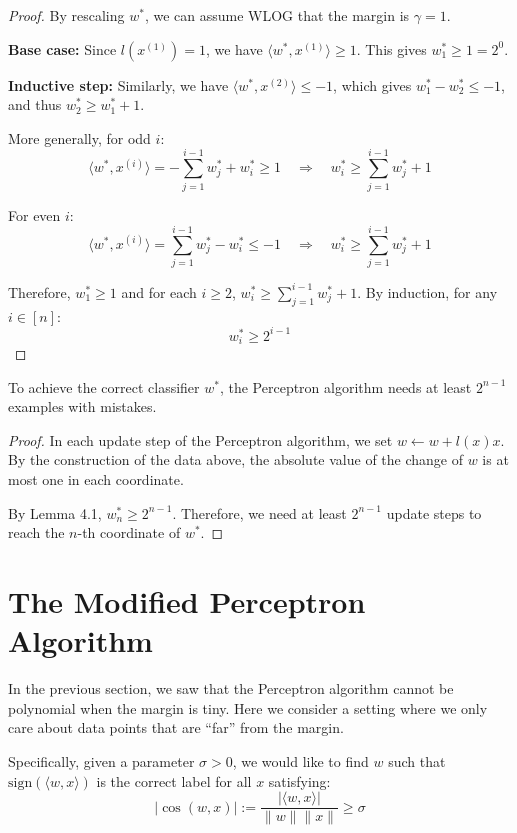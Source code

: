 \documentclass[main.tex]{subfiles}
\begin{document}
\begin{proof}
By rescaling $w^*$, we can assume WLOG that the margin is $\gamma = 1$.

\textbf{Base case:} Since $l(x^{(1)}) = 1$, we have $\langle w^*, x^{(1)} \rangle \geq 1$. This gives $w^*_1 \geq 1 = 2^0$.

\textbf{Inductive step:} Similarly, we have $\langle w^*, x^{(2)} \rangle \leq -1$, which gives $w^*_1 - w^*_2 \leq -1$, and thus $w^*_2 \geq w^*_1 + 1$.

More generally, for odd $i$:
$$\langle w^*, x^{(i)} \rangle = -\sum_{j=1}^{i-1} w^*_j + w^*_i \geq 1 \quad \Rightarrow \quad w^*_i \geq \sum_{j=1}^{i-1} w^*_j + 1$$

For even $i$:
$$\langle w^*, x^{(i)} \rangle = \sum_{j=1}^{i-1} w^*_j - w^*_i \leq -1 \quad \Rightarrow \quad w^*_i \geq \sum_{j=1}^{i-1} w^*_j + 1$$

Therefore, $w^*_1 \geq 1$ and for each $i \geq 2$, $w^*_i \geq \sum_{j=1}^{i-1} w^*_j + 1$. By induction, for any $i \in [n]$:
$$w^*_i \geq 2^{i-1}$$
\end{proof}

\begin{corollary}
To achieve the correct classifier $w^*$, the Perceptron algorithm needs at least $2^{n-1}$ examples with mistakes.
\end{corollary}

\begin{proof}
In each update step of the Perceptron algorithm, we set $w \leftarrow w + l(x)x$. By the construction of the data above, the absolute value of the change of $w$ is at most one in each coordinate.

By Lemma 4.1, $w^*_n \geq 2^{n-1}$. Therefore, we need at least $2^{n-1}$ update steps to reach the $n$-th coordinate of $w^*$.
\end{proof}

\needspace{0.33\textheight}
\section{The Modified Perceptron Algorithm}

In the previous section, we saw that the Perceptron algorithm cannot be polynomial when the margin is tiny. Here we consider a setting where we only care about data points that are ``far'' from the margin.

Specifically, given a parameter $\sigma > 0$, we would like to find $w$ such that $\text{sign}(\langle w, x \rangle)$ is the correct label for all $x$ satisfying:
$$|\cos(w, x)| := \frac{|\langle w, x \rangle|}{\|w\| \|x\|} \geq \sigma$$
\end{document}

